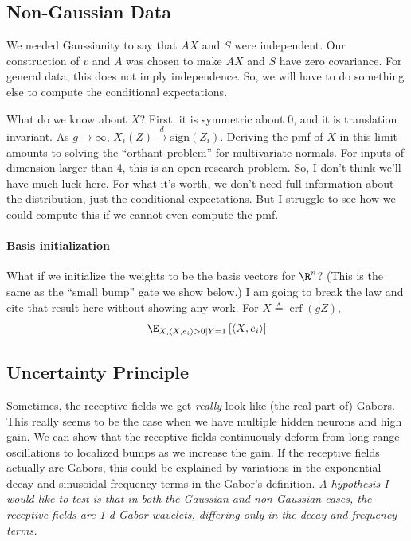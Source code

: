 \documentclass{article}
\begin{document}
\subsection*{Non-Gaussian Data}
We needed Gaussianity to say that $A X$ and $S$ were independent.
Our construction of $v$ and $A$ was chosen to make $A X$ and $S$ have zero covariance.
For general data, this does not imply independence.
So, we will have to do something else to compute the conditional expectations.

What do we know about $X$?
First, it is symmetric about 0, and it is translation invariant.
As $g \to \infty$, $X_i(Z) \overset{d}{\to} \text{sign}(Z_i)$.
Deriving the pmf of $X$ in this limit amounts to solving the ``orthant problem'' for multivariate normals.
For inputs of dimension larger than 4, this is an open research problem.
So, I don't think we'll have much luck here.
For what it's worth, we don't need full information about the distribution, just the conditional expectations.
But I struggle to see how we could compute this if we cannot even compute the pmf.

\paragraph*{Basis initialization}
What if we initialize the weights to be the basis vectors for $\R^n$?
(This is the same as the ``small bump'' gate we show below.)
I am going to break the law and cite that result here without showing any work.
For $X \triangleq \operatorname{erf}(g Z)$,
\begin{align}
  \E_{ X, \langle X, e_i \rangle > 0 \mid Y = 1 } \left[ \langle X, e_i \rangle \right] 
\end{align}

\subsection*{Uncertainty Principle}
Sometimes, the receptive fields we get \emph{really} look like (the real part of) Gabors.
This really seems to be the case when we have multiple hidden neurons and high gain.
We can show that the receptive fields continuously deform from long-range oscillations to localized bumps as we increase the gain.
If the receptive fields actually are Gabors, this could be explained by variations in the exponential decay and sinusoidal frequency terms in the Gabor's definition.
\emph{A hypothesis I would like to test is that in both the Gaussian and non-Gaussian cases, the receptive fields are 1-d Gabor wavelets, differing only in the decay and frequency terms.}
\end{document}
